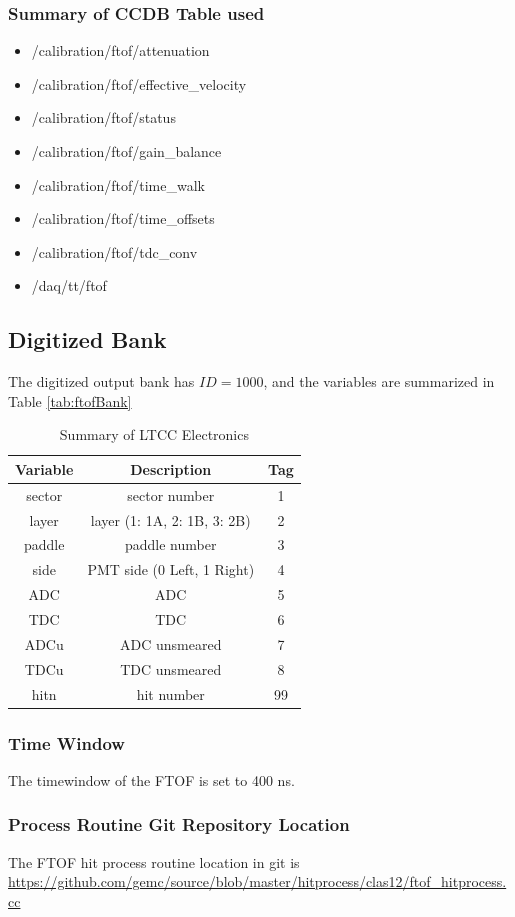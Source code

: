 \subsubsection{Summary of CCDB Table used}
\begin{itemize}
	\item /calibration/ftof/attenuation
	\item /calibration/ftof/effective\_velocity
	\item /calibration/ftof/status
	\item /calibration/ftof/gain\_balance
	\item /calibration/ftof/time\_walk
	\item /calibration/ftof/time\_offsets
	\item /calibration/ftof/tdc\_conv
	\item /daq/tt/ftof
\end{itemize}

\subsection{Digitized Bank}
The digitized output bank has $ID=1000$, and the variables are summarized in Table \ref{tab:ftofBank}

\begin{table}[h]
	\begin{center}
		\begin{tabular}{| c | c | c |}
			\hline \hline
			Variable         & Description  & Tag  \\
			\hline
              sector  &                             sector number  &    1 \\
               layer  &               layer (1: 1A, 2: 1B, 3: 2B)  &    2 \\
              paddle  &                             paddle number  &    3 \\
                side  &                PMT side (0 Left, 1 Right)  &    4 \\
                 ADC  &                                       ADC  &    5 \\
                 TDC  &                                       TDC  &    6 \\
                ADCu  &                             ADC unsmeared  &    7 \\
                TDCu  &                             TDC unsmeared  &    8 \\
                hitn  &                                hit number  &   99 \\
			\hline \hline
		\end{tabular}
	\end{center}
	\caption{Summary of LTCC Electronics}\label{tab:ltccChannels}
\end{table}


\subsubsection{Time Window}

The timewindow of the FTOF is set to 400 ns.

\subsubsection{Process Routine Git Repository Location}
The FTOF hit process routine location in git is \url{https://github.com/gemc/source/blob/master/hitprocess/clas12/ftof_hitprocess.cc}


